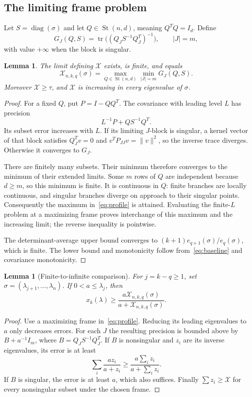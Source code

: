 \documentclass[11pt]{article}
\newtheorem{lemma}[theorem]{Lemma}
\theoremstyle{remark}\newtheorem{remark}[theorem]{Remark}
\newcommand{\tr}{\operatorname{tr}}
\newcommand{\diag}{\operatorname{diag}}
\newcommand{\St}{\operatorname{St}}
\newcommand{\X}{\mathcal X}
\begin{document}
\subsection{The limiting frame problem}
Let $S=\diag(\sigma)$ and let $Q\in\St(n,d)$, meaning $Q^TQ=I_d$. Define
\[
 G_J(Q,S)=\tr\bigl((Q_J S^{-1}Q_J^T)^{-1}\bigr),\qquad |J|=m,
\]
with value $+\infty$ when the block is singular.
\begin{lemma}\label{le:limit}
The limit defining $\X$ exists, is finite, and equals
\begin{equation}\label{eq:profile}
 \X_{n,k,q}(\sigma)
 =\max_{Q\in\St(n,d)}\min_{|J|=m}G_J(Q,S).
\end{equation}
Moreover $\X\ge\tau$, and $\X$ is increasing in every eigenvalue of $\sigma$.
\end{lemma}
\begin{proof}
For a fixed $Q$, put $P=I-QQ^T$. The covariance with leading level $L$ has precision
\[
 L^{-1}P+Q S^{-1}Q^T.
\]
Its subset error increases with $L$. If its limiting $J$-block is singular, a kernel vector of that block satisfies $Q_J^Tv=0$ and $v^TP_{JJ}v=\|v\|^2$, so the inverse trace diverges. Otherwise it converges to $G_J$.

There are finitely many subsets. Their minimum therefore converges to the minimum of their extended limits. Some $m$ rows of $Q$ are independent because $d\ge m$, so this minimum is finite. It is continuous in $Q$: finite branches are locally continuous, and singular branches diverge on approach to their singular points. Consequently the maximum in~\eqref{eq:profile} is attained. Evaluating the finite-$L$ problem at a maximizing frame proves interchange of this maximum and the increasing limit; the reverse inequality is pointwise.

The determinant-average upper bound converges to $(k+1)e_{q+1}(\sigma)/e_q(\sigma)$, which is finite. The lower bound and monotonicity follow from~\eqref{eq:baseline} and covariance monotonicity.
\end{proof}

\begin{lemma}[Finite-to-infinite comparison]\label{le:finite}
For $j=k-q\ge1$, set $\sigma=(\lambda_{j+1},\ldots,\lambda_n)$. If $0<a\le\lambda_j$, then
\begin{equation}\label{eq:finite}
 x_k(\lambda)\ge
 \frac{a\X_{n,k,q}(\sigma)}{a+\X_{n,k,q}(\sigma)}.
\end{equation}
\end{lemma}
\begin{proof}
Use a maximizing frame in~\eqref{eq:profile}. Reducing its leading eigenvalues to $a$ only decreases errors. For each $J$ the resulting precision is bounded above by $B+a^{-1}I_m$, where $B=Q_JS^{-1}Q_J^T$. If $B$ is nonsingular and $z_i$ are its inverse eigenvalues, its error is at least
\[
 \sum_i\frac{a z_i}{a+z_i}
 \ge\frac{a\sum_i z_i}{a+\sum_i z_i}.
\]
If $B$ is singular, the error is at least $a$, which also suffices. Finally $\sum z_i\ge\X$ for every nonsingular subset under the chosen frame.
\end{proof}
\end{document}
